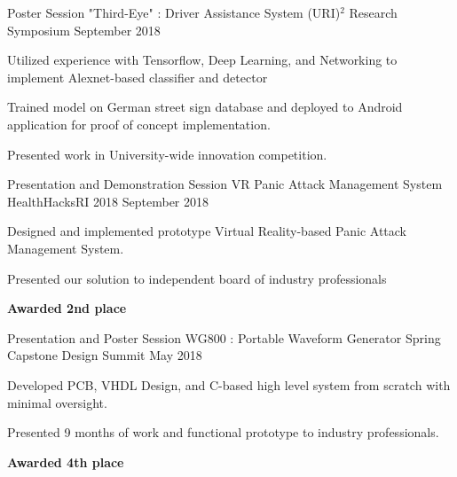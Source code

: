 \gradheader
\begin{cventries}
    \cventry
    {Poster Session}
    {"Third-Eye" : Driver Assistance System}
    {(URI)$^2$ Research Symposium}
    {September 2018}
    {
      \begin{cvitems}
        \item{Utilized experience with Tensorflow, Deep Learning, and Networking to implement Alexnet-based classifier and detector}
        \item{Trained model on German street sign database and deployed to Android application for proof of concept implementation.}
        \item{Presented work in University-wide innovation competition.}
      \end{cvitems}
    }
  \cventry
    {Presentation and Demonstration Session}
    {VR Panic Attack Management System}
    {HealthHacksRI 2018}
    {September 2018}
    {
      \begin{cvitems}
        \item {Designed and implemented prototype Virtual Reality-based Panic Attack Management System.}
        \item{Presented our solution to independent board of industry professionals}
        \item{\textbf{Awarded 2nd place}}
      \end{cvitems}
    }
\end{cventries}
\vspace{-10 pt}
\ugradheader
\begin{cventries}
  \cventry
    {Presentation and Poster Session}
    {WG800 : Portable Waveform Generator}
    {Spring Capstone Design Summit}
    {May 2018}
    {
    \begin{cvitems}
      \item{Developed PCB, VHDL Design, and C-based high level system from scratch with minimal oversight.}
      \item{Presented 9 months of work and functional prototype to industry professionals.}
      \item{\textbf{Awarded 4th place}}
    \end{cvitems}
    }
\end{cventries}
\vspace{-10 pt}
